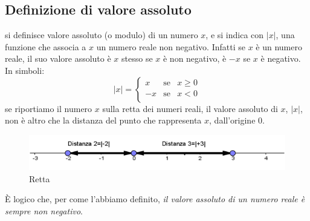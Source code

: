 \subsection{Definizione di valore assoluto}
si definisce valore assoluto (o modulo) di un numero $x$, e si indica con 
$|x|$, 
una funzione che associa a $x$ un numero reale non negativo. Infatti se $x$ è 
un 
numero reale, il suo valore assoluto è $x$ stesso se $x$ è non negativo, è $-x$ 
se $x$ è negativo.\\
In simboli:
$$|x|=\left\lbrace 
\begin{array}{lcl}
x & \text{se} & x\geq 0 \\
-x & \text{se} & x< 0 \\
\end{array}
\right. 
$$
se riportiamo il numero $x$ sulla retta dei numeri reali, il valore assoluto di 
$x$, $|x|$, non è altro che la distanza del punto che rappresenta $x$, 
dall'origine 0.


\begin{figure}[h]
\begin{inaccessibleblock}[TODO]
\centering
\includegraphics[width=0.9\linewidth]{img/imm1} %
\end{inaccessibleblock}
\caption{Retta}
\label{fig:abs_imm1}
\end{figure}


È logico che, per come l'abbiamo definito,\textit{ il valore assoluto di un 
numero reale è sempre non negativo}.

